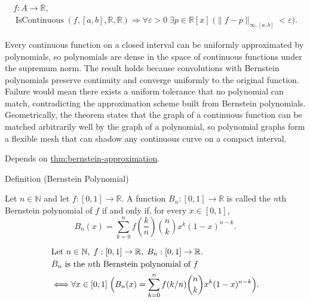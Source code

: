 \begin{remark*}
\[
\begin{aligned}
  f\colon A\to\mathbb{R},\\
\operatorname{IsContinuous}(f,[a,b],\mathbb{R},\mathbb{R})
\Longrightarrow
\forall \varepsilon>0\;\exists p\in\mathbb{R}[x]\;
\bigl(\|f-p\|_{\infty,[a,b]}<\varepsilon\bigr).
\end{aligned}
\]
\end{remark*}

\begin{remark*}[Interpretation]
Every continuous function on a closed interval can be uniformly approximated by polynomials, so polynomials are dense in the space of continuous functions under the supremum norm. The result holds because convolutions with Bernstein polynomials preserve continuity and converge uniformly to the original function. Failure would mean there exists a uniform tolerance that no polynomial can match, contradicting the approximation scheme built from Bernstein polynomials. Geometrically, the theorem states that the graph of a continuous function can be matched arbitrarily well by the graph of a polynomial, so polynomial graphs form a flexible mesh that can shadow any continuous curve on a compact interval.
\end{remark*}

\begin{dependencies}
Depends on \hyperref[thm:bernstein-approximation]{thm:bernstein-approximation}.
\end{dependencies}


\begin{definitionbox}{Definition (Bernstein Polynomial)}
\begin{definition}
\label{def:bernstein-polynomial}
Let $n \in \mathbb{N}$ and let $f:[0,1]\to\mathbb{R}$.
A function $B_n:[0,1]\to\mathbb{R}$ is called the $n$th Bernstein polynomial of $f$
if and only if, for every $x \in [0,1]$,
\[
B_n(x)=\sum_{k=0}^{n} f\!\left(\frac{k}{n}\right)\binom{n}{k}x^k(1-x)^{n-k}.
\]
\end{definition}
\end{definitionbox}

\begin{remark*}
\[
\begin{aligned}
&\text{Let }n\in\mathbb{N},\; f:[0,1]\to\mathbb{R},\; B_n:[0,1]\to\mathbb{R}.\\
&B_n \text{ is the } n\text{th Bernstein polynomial of } f\\
&\Longleftrightarrow
\forall x\in[0,1]\;
\Bigl(
B_n(x)=\sum_{k=0}^n f(k/n)\binom{n}{k}x^k(1-x)^{n-k}
\Bigr).
\end{aligned}
\]
\end{remark*}

